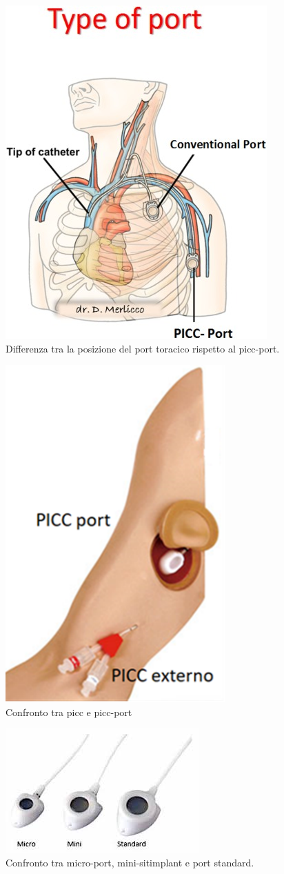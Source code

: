 \begin{figure}[H]
    \begin{center}
    \includegraphics[width=0.4\columnwidth]{img/picc-port.jpg}
    \end{center}
    \caption[Differenza tra la posizione del port toracico rispetto al picc-port.]{Differenza tra la posizione del port toracico rispetto al picc-port.
    \cite{img48}}

\end{figure}

\begin{figure}[H]
    \begin{center}
    \includegraphics[width=0.3\columnwidth]{img/PartesPICC.png}
    \end{center}
    \caption[Confronto tra picc e picc-port]{Confronto tra picc e picc-port
    \cite{img49}}

\end{figure}

\begin{figure}[H]
    \begin{center}
    \includegraphics[width=0.4\columnwidth]{img/portconfronto.jpeg}
    \end{center}
    \caption[Confronto tra micro-port, mini-sitimplant e port standard.]{Confronto tra micro-port, mini-sitimplant e port standard.
    \cite{img50}}

\end{figure}

